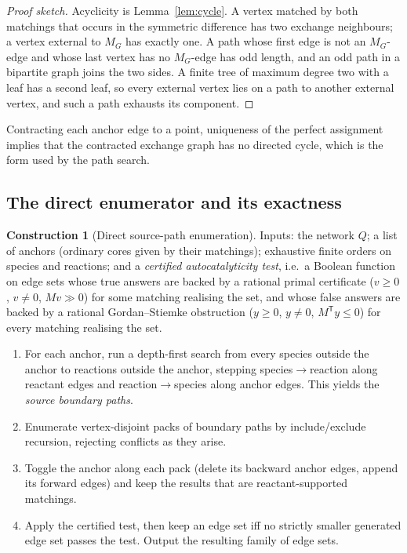 \documentclass[11pt,a4paper]{article}
\theoremstyle{plain}
\theoremstyle{definition}
\newtheorem{construction}[theorem]{Construction}
\theoremstyle{remark}
\newcommand{\Tp}{^{\mathsf T}}
\newcommand{\ie}{i.e.}
\begin{document}
\begin{proof}[Proof sketch]
Acyclicity is Lemma~\ref{lem:cycle}. A vertex matched by both matchings that occurs in the symmetric difference has two exchange neighbours; a vertex external to $M_G$ has exactly one. A path whose first edge is not an $M_G$-edge and whose last vertex has no $M_G$-edge has odd length, and an odd path in a bipartite graph joins the two sides. A finite tree of maximum degree two with a leaf has a second leaf, so every external vertex lies on a path to another external vertex, and such a path exhausts its component.
\end{proof}

Contracting each anchor edge to a point, uniqueness of the perfect assignment implies that the contracted exchange graph has no directed cycle, which is the form used by the path search.

\subsection{The direct enumerator and its exactness}

\begin{construction}[Direct source-path enumeration]\label{con:enum}
Inputs: the network $Q$; a list of anchors (ordinary cores given by their matchings); exhaustive finite orders on species and reactions; and a \emph{certified autocatalyticity test}, \ie\ a Boolean function on edge sets whose \textsf{true} answers are backed by a rational primal certificate ($v\ge 0$, $v\ne 0$, $M v\gg 0$) for some matching realising the set, and whose \textsf{false} answers are backed by a rational Gordan--Stiemke obstruction ($y\ge 0$, $y\ne 0$, $M\Tp y\le 0$) for every matching realising the set.
\begin{enumerate}
\item For each anchor, run a depth-first search from every species outside the anchor to reactions outside the anchor, stepping species$\to$reaction along reactant edges and reaction$\to$species along anchor edges. This yields the \emph{source boundary paths}.
\item Enumerate vertex-disjoint packs of boundary paths by include/exclude recursion, rejecting conflicts as they arise.
\item Toggle the anchor along each pack (delete its backward anchor edges, append its forward edges) and keep the results that are reactant-supported matchings.
\item Apply the certified test, then keep an edge set iff no strictly smaller generated edge set passes the test. Output the resulting family of edge sets.
\end{enumerate}
\end{construction}
\end{document}
